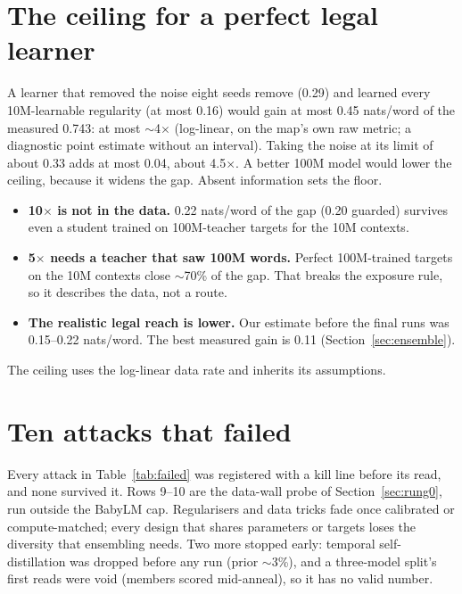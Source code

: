 \documentclass[11pt]{article}
\begin{document}
\section{The ceiling for a perfect legal learner}
\label{sec:ceiling}
A learner that removed the noise eight seeds remove (0.29) and learned every 10M-learnable regularity (at most 0.16)
would gain at most 0.45 nats/word of the measured 0.743: at most $\sim$4$\times$ (log-linear, on the map's own raw
metric; a diagnostic point estimate without an interval). Taking the noise at its limit of about 0.33 adds at most
0.04, about 4.5$\times$. A better 100M model would lower the ceiling, because it widens the gap. Absent information
sets the floor.
\begin{itemize}
\item \textbf{10$\times$ is not in the data.} 0.22 nats/word of the gap (0.20 guarded) survives even a student trained
  on 100M-teacher targets for the 10M contexts.
\item \textbf{5$\times$ needs a teacher that saw 100M words.} Perfect 100M-trained targets on the 10M contexts close
  $\sim$70\% of the gap. That breaks the exposure rule, so it describes the data, not a route.
\item \textbf{The realistic legal reach is lower.} Our estimate before the final runs was 0.15--0.22 nats/word.
  The best measured gain is 0.11 (Section~\ref{sec:ensemble}).
\end{itemize}
The ceiling uses the log-linear data rate and inherits its assumptions.

\section{Ten attacks that failed}
\label{sec:failed}
Every attack in Table~\ref{tab:failed} was registered with a kill line before its read, and none survived it. Rows
9--10 are the data-wall probe of Section~\ref{sec:rung0}, run outside the BabyLM cap.
Regularisers and data tricks fade once calibrated or compute-matched; every design that shares parameters or targets
loses the diversity that ensembling needs. Two more stopped early: temporal self-distillation was dropped before any run
(prior $\sim$3\%), and a three-model split's first reads were void (members scored mid-anneal), so it has no valid
number.
\end{document}
